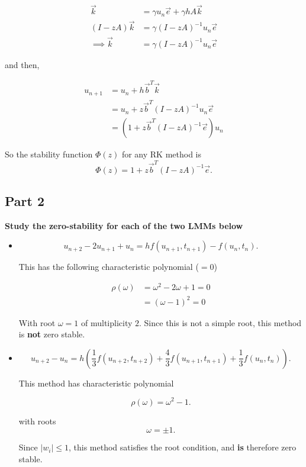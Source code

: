 \documentclass[12pt,a4paper]{article}
\begin{document}
\begin{itemize}
    \begin{align*}
      \vec{k} &= \gamma u_{n}\vec{e}+ \gamma hA\vec{k} \\
      (I-zA)\vec{k} & = \gamma (I-zA)^{-1}u_{n}\vec{e} \\
      \implies \vec{k} &= \gamma (I-zA)^{-1} u_{n} \vec{e}
    \end{align*}

    \par and then,

    \begin{align*}
      u_{n+1} &= u_{n} + h\vec{b}^T\vec{k} \\
             &= u_{n} + z \vec{b}^{T} (I-zA)^{-1} u_{n} \vec{e} \\
             &= \left(1 +z \vec{b}^{T} (I-zA)^{-1}  \vec{e} \right) u_{n}
    \end{align*}

    \par So the stability function $\Phi (z)$ for any RK method is
    \[
    \boxed{\Phi (z) = 1 +z \vec{b}^{T} (I-zA)^{-1}  \vec{e}}
    .\] 

\end{itemize}

\subsection{Part 2}%
\label{sub:part_2}

\par \textbf{Study the zero-stability for each of the two LMMs below}

\begin{itemize}
  \item \[
      u_{n+2}-2u_{n+1} + u_{n} = hf(u_{n+1},t_{n+1}) - f(u_{n},t_{n})
  .\] 

  \par This has the following characteristic polynomial ($=0$)

  \begin{align*}
    \rho (\omega) &= \omega^{2} -2 \omega + 1 = 0 \\
                  &= ( \omega - 1)^{2} = 0
  \end{align*}

  With root $ \omega = 1$ of multiplicity $2$. Since this is not a simple root,
  this method is \textbf{not} zero stable.

\item \[
    u_{n+2} - u_{n} = h \left( \frac{1}{3} f(u_{n+2}, t_{n+2}) + \frac{4}{3}
    f(u_{n+1},t_{n+1}) + \frac{1}{3}f(u_n,t_n)\right)
.\] 

\par This method has characteristic polynomial 

\[
  \rho ( \omega) = \omega^{2} -1
.\] 

with roots 
\[
\omega = \pm 1
.\] 

Since $|w_i|\leq 1$, this method satisfies the root condition, and \textbf{is} therefore
zero stable.

\end{itemize}
\end{document}
